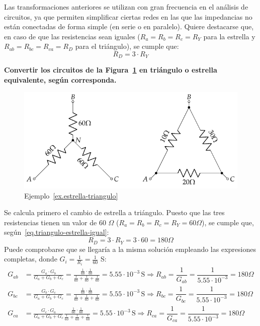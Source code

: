 \documentclass[11pt]{book} %
\begin{document}
	Las transformaciones anteriores se utilizan con gran frecuencia en el análisis de circuitos, ya que permiten simplificar ciertas redes en las que las impedancias no están
	conectadas de forma simple (en serie o en paralelo). Quiere destacarse que, en caso de que las resistencias sean iguales ($R_a=R_b=R_c=R_Y$ para la estrella y $R_{ab}=R_{bc}=R_{ca}=R_D$ para el triángulo), se cumple que: 
	\begin{equation}\label{eq.triangulo-estrella-igual}
		\boxed{R_D=3\cdot R_Y}
	\end{equation}
	
	\begin{example}\label{ex.estrella-triangulo}
	\textbf{Convertir los circuitos de la Figura~\ref{fig.ejercicio7-bt1} en triángulo o estrella equivalente, según corresponda. }
 \begin{figure}[H]
 		\centering
\includegraphics{../figs/ej7_BT1.pdf}
 		\caption{Ejemplo~\ref{ex.estrella-triangulo}}
 		\label{fig.ejercicio7-bt1}
 	\end{figure}
 	
 	Se calcula primero el cambio de estrella a triángulo. Puesto que las tres resistencias tienen un valor de 60 $\Omega$ ($R_a=R_b=R_c=R_Y=60\Omega$), se cumple que, según~\eqref{eq.triangulo-estrella-igual}: 
	\begin{equation*}
		R_D=3\cdot R_Y=3\cdot 60=180\Omega
	\end{equation*}
	Puede comprobarse que se llegaría a la misma solución empleando las expresiones completas, donde $G_i=\frac{1}{R_i}=\frac{1}{60}$ S: 
	\begin{align*}
			G_{ab} &= \frac{G_a \cdot G_b}{G_a + G_b + G_c}=\frac{\frac{1}{60} \cdot \frac{1}{60}}{\frac{1}{60} + \frac{1}{60} + \frac{1}{60}}=5.55\cdot 10^{-3}\,\text{S}\Rightarrow R_{ab}=\dfrac{1}{G_{ab}}=\dfrac{1}{5.55\cdot 10^{-3}}=180\Omega\\[10pt]
			G_{bc} &= \frac{G_b \cdot G_c}{G_a + G_b + G_c}=\frac{\frac{1}{60} \cdot \frac{1}{60}}{\frac{1}{60} + \frac{1}{60} + \frac{1}{60}}=5.55\cdot 10^{-3}\,\text{S}\Rightarrow R_{bc}=\dfrac{1}{G_{bc}}=\dfrac{1}{5.55\cdot 10^{-3}}=180\Omega\\[10pt]
			G_{ca} &= \frac{G_c \cdot G_a}{G_a + G_b + G_c}\frac{\frac{1}{60} \cdot \frac{1}{60}}{\frac{1}{60} + \frac{1}{60} + \frac{1}{60}}=5.55\cdot 10^{-3}\,\text{S}\Rightarrow R_{ca}=\dfrac{1}{G_{ca}}=\dfrac{1}{5.55\cdot 10^{-3}}=180\Omega
		\end{align*}


\end{example}
\end{document}

